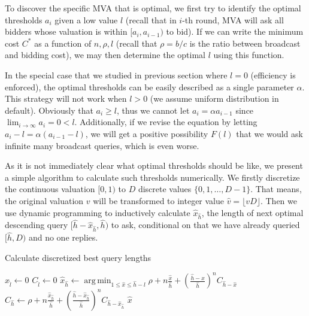 To discover the specific MVA that is optimal, we first try to identify the
optimal thresholds $a_i$ given a low value $l$  (recall that in $i$-th round,
MVA will ask all bidders whose valuation is within $[a_i, a_{i-1})$ to bid).
If we can write the minimum cost $C^*$ as a function of $n, \rho, l$ (recall
that $\rho = b/c$ is the ratio between broadcast and bidding cost), we may then
determine the optimal $l$ using this function.

In the special case that we studied in previous section where $l = 0$
(efficiency is enforced), the optimal thresholds can be easily described as a
single parameter $\alpha$. This strategy will not work when $l > 0$ (we assume uniform
distribution in default). Obviously that $a_i \geq l$,
thus we cannot let $a_i = \alpha a_{i-1}$ since $\lim_{i \rightarrow \infty} a_i
= 0 < l$.  Additionally, if we revise the equation by letting $a_i-l = \alpha
(a_{i-1}-l)$, we will get a positive possibility $F(l)$ that we would ask
infinite many broadcast queries, which is even worse.

As it is not immediately clear what optimal thresholds should be like, we
present a simple algorithm to calculate such thresholds numerically. We firstly
discretize the continuous valuation $[0, 1)$ to $D$ discrete values $\{0, 1, \ldots,
D-1\}$. That means, the original valuation $v$ will be transformed to integer
value $\hat v = \lfloor v D \rfloor$. Then we use dynamic programming to
inductively calculate $\hat x_{\hat h}$, the length of next optimal descending
query $[\hat h-\hat x_{\hat h}, \hat h)$ to ask, conditional on that we have
already queried $[\hat h, D)$ and no one replies.

\begin{algorithm}
    \caption{Calculate discretized best query lengths}\label{algo:discrete}
    \begin{algorithmic}[1]
        
            \State $\hat x_{\hat l} \gets 0$
            \State $C_{\hat l} \gets 0$
                \State $\hat x_{\hat h} \gets \displaystyle
                  \operatorname*{arg\,min}_{1 \leq \hat x \leq \hat h-l} \rho + n
                  \frac{\hat x}{\hat h} + (\frac{\hat h-x}{\hat h})^n C_{\hat h-\hat x}$
                \State $C_{\hat h} \gets \rho + n \frac{\hat x_{\hat h}}{\hat h} +
                  (\frac{\hat h-\hat x_{\hat h}}{\hat h})^n C_{\hat h-\hat x_{\hat h}}$
            \EndFor
            \State \Return $\hat x$
        \EndFunction
    \end{algorithmic}
\end{algorithm}

